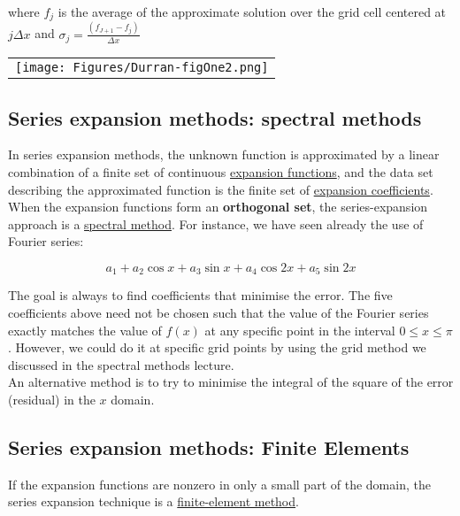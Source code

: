 	where $f_j$ is the average of the approximate solution over the grid cell centered at $j \Delta x$ and $\sigma_j =\frac{(f_{J+1}-f_j)}{\Delta x}$ 
	
	\begin{center}
		\begin{tabular}{c}
			\texttt{[image: Figures/Durran-figOne2.png]}
		\end{tabular}
	\end{center}
	

\subsection{Series expansion methods: spectral methods}
	
	In series expansion methods, the unknown function is approximated by a linear combination of a finite set of continuous \underline{expansion functions}, and the data set describing the approximated function is the finite set of \underline{expansion coefficients}.\\
	
	\medskip
	When the expansion functions form an \textbf{orthogonal set}, the series-expansion approach is a \underline{spectral method}. For instance, we have seen already the use of Fourier series:
	
	\begin{equation}
		a_1+a_2\cos{x}+a_3\sin{x}+a_4\cos{2x}+a_5\sin{2x}
	\end{equation}
	
	\medskip
	The goal is always to find coefficients that minimise the error. The five coefficients above need not be chosen such that the value of the Fourier series exactly matches the value of $f(x)$ at any specific point in the interval $0 \leq x \leq \pi$. However, we could do it at specific grid points by using the grid method we discussed in the spectral methods lecture.\\
	
	An alternative method is to try to minimise the integral of the square of the error (residual) in the $x$ domain.


\subsection{Series expansion methods: Finite Elements}
	
	
	If the expansion functions are nonzero in only a small part of the domain, the series expansion technique is a \underline{finite-element method}.
	
